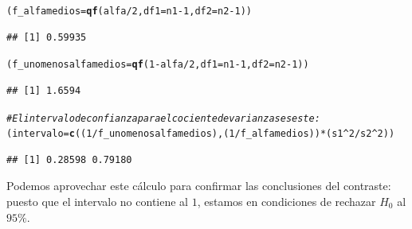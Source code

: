 \documentclass[10pt,a4paper]{article}\usepackage[]{graphicx}\usepackage[]{color}
\makeatletter
\newcommand{\hlnum}[1]{\textcolor[rgb]{0.686,0.059,0.569}{#1}}%
\newcommand{\hlcom}[1]{\textcolor[rgb]{0.678,0.584,0.686}{\textit{#1}}}%
\newcommand{\hlopt}[1]{\textcolor[rgb]{0,0,0}{#1}}%
\newcommand{\hlstd}[1]{\textcolor[rgb]{0.345,0.345,0.345}{#1}}%
\newcommand{\hlkwb}[1]{\textcolor[rgb]{0.69,0.353,0.396}{#1}}%
\newcommand{\hlkwc}[1]{\textcolor[rgb]{0.333,0.667,0.333}{#1}}%
\newcommand{\hlkwd}[1]{\textcolor[rgb]{0.737,0.353,0.396}{\textbf{#1}}}%
\newenvironment{kframe}{%
 \def\at@end@of@kframe{}%
 \ifinner\ifhmode%
  \def\at@end@of@kframe{\end{minipage}}%
  \begin{minipage}{\columnwidth}%
 \fi\fi%
 \def\FrameCommand##1{\hskip\@totalleftmargin \hskip-\fboxsep
 \colorbox{shadecolor}{##1}\hskip-\fboxsep
     \hskip-\linewidth \hskip-\@totalleftmargin \hskip\columnwidth}%
 \MakeFramed {\advance\hsize-\width
   \@totalleftmargin\z@ \linewidth\hsize
   \@setminipage}}%
 {\par\unskip\endMakeFramed%
 \at@end@of@kframe}
\newenvironment{knitrout}{}{} %
\newcounter {cont01}
\makeatother
\begin{document}
\begin{knitrout}
\begin{kframe}
\begin{alltt}
\hlstd{(f_alfamedios} \hlkwb{=} \hlkwd{qf}\hlstd{(alfa}\hlopt{/}\hlnum{2}\hlstd{,} \hlkwc{df1}\hlstd{=n1} \hlopt{-} \hlnum{1}\hlstd{,} \hlkwc{df2}\hlstd{=n2} \hlopt{-} \hlnum{1}\hlstd{))}
\end{alltt}
\begin{verbatim}
## [1] 0.59935
\end{verbatim}
\begin{alltt}
\hlstd{(f_unomenosalfamedios} \hlkwb{=} \hlkwd{qf}\hlstd{(}\hlnum{1} \hlopt{-} \hlstd{alfa}\hlopt{/}\hlnum{2}\hlstd{,} \hlkwc{df1}\hlstd{=n1} \hlopt{-} \hlnum{1}\hlstd{,} \hlkwc{df2}\hlstd{= n2}\hlopt{-}\hlnum{1}\hlstd{))}
\end{alltt}
\begin{verbatim}
## [1] 1.6594
\end{verbatim}
\begin{alltt}
\hlcom{# El intervalo de confianza para el cociente de varianzas es este:}
\hlstd{(intervalo} \hlkwb{=} \hlkwd{c}\hlstd{( (}\hlnum{1}\hlopt{/}\hlstd{f_unomenosalfamedios), (}\hlnum{1}\hlopt{/}\hlstd{f_alfamedios))} \hlopt{*} \hlstd{(s1}\hlopt{^}\hlnum{2}\hlopt{/}\hlstd{s2}\hlopt{^}\hlnum{2}\hlstd{))}
\end{alltt}
\begin{verbatim}
## [1] 0.28598 0.79180
\end{verbatim}
\end{kframe}
\end{knitrout}

Podemos aprovechar este cálculo para confirmar las conclusiones del contraste: puesto que el intervalo no contiene al $1$, estamos en condiciones de rechazar $H_0$ al $95\%$.


%
%
%
%
\end{document}
